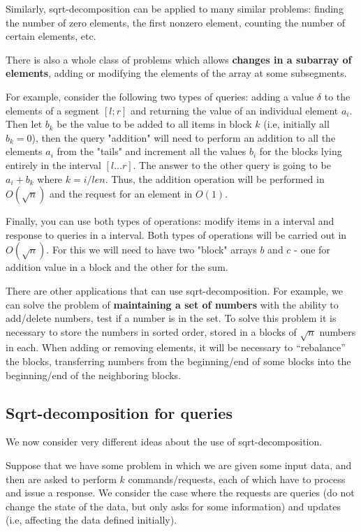 Similarly, sqrt-decomposition can be applied to many similar problems: finding the number of zero elements, the first nonzero element, counting the number of certain elements, etc.

There is also a whole class of problems which allows \textbf{changes in a subarray of elements}, adding or modifying the elements of the array at some subsegments.

For example, consider the following two types of queries: adding a value $\delta$ to the elements of a segment $[l; r]$ and returning the value of an individual element $a_i$. Then let $b_k$ be the value to be added to all items in block $k$  (i.e, initially all $b_k = 0$), then the query "addition" will need to perform an addition to all the elements $a_i$ from the "tails" and increment all the values $b_i$ for the blocks lying entirely in the interval $[l \ldots r]$. The answer to the other query is going to be $a_i + b_k$ where $k = i / len$. Thus, the addition operation will be performed in $O (\sqrt {n})$ and the request for an element in $O (1)$.

Finally, you can use both types of operations: modify items in a interval and response to queries in a interval. Both types of operations will be carried out in $O (\sqrt {n})$. For this we will need to have two "block" arrays $b$ and $c$ - one for addition value in a block and the other for the sum.

There are other applications that can use sqrt-decomposition. For example, we can solve the problem of \textbf{maintaining a set of numbers} with the ability to add/delete numbers, test if a number is in the set. To solve this problem it is necessary to store the numbers in sorted order, stored in a blocks of $\sqrt {n}$ numbers in each. When adding or removing elements, it will be necessary to 	 ``rebalance'' the blocks, transferring numbers from the beginning/end of some blocks into the beginning/end of the neighboring blocks.

\subsection{ Sqrt-decomposition for queries }

We now consider very different ideas about the use of sqrt-decomposition.

Suppose that we have some problem in which we are given some input data, and then are asked to perform $k$ commands/requests, each of which have to process and issue a response. We consider the case where the requests are queries (do not change the state of the data, but only asks for some information) and updates (i.e, affecting the data defined initially).

